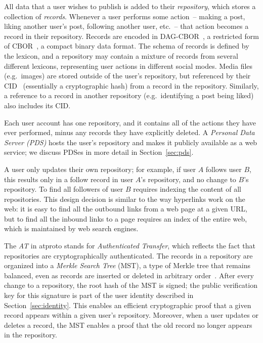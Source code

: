 \documentclass[sigconf,nonacm]{acmart}
\begin{document}
All data that a user wishes to publish is added to their \emph{repository}, which stores a collection of \emph{records}.
Whenever a user performs some action~-- making a post, liking another user's post, following another user, etc.~-- that action becomes a record in their repository.
Records are encoded in DAG-CBOR~\cite{DAG-CBOR}, a restricted form of CBOR~\cite{CBOR}, a compact binary data format.
The schema of records is defined by the lexicon, and a repository may contain a mixture of records from several different lexicons, representing user actions in different social modes.
Media files (e.g.\ images) are stored outside of the user's repository, but referenced by their CID~\cite{CID} (essentially a cryptographic hash) from a record in the repository.
Similarly, a reference to a record in another repository (e.g.\ identifying a post being liked) also includes its CID.

Each user account has one repository, and it contains all of the actions they have ever performed, minus any records they have explicitly deleted.
A \emph{Personal Data Server (PDS)} hosts the user's repository and makes it publicly available as a web service; we discuss PDSes in more detail in Section~\ref{sec:pds}.

A user only updates their own repository; for example, if user $A$ follows user $B$, this results only in a follow record in user $A$'s repository, and no change to $B$'s repository.
To find all followers of user $B$ requires indexing the content of all repositories.
This design decision is similar to the way hyperlinks work on the web: it is easy to find all the outbound links from a web page at a given URL, but to find all the inbound links to a page requires an index of the entire web, which is maintained by web search engines.

The \emph{AT} in atproto stands for \emph{Authenticated Transfer}, which reflects the fact that repositories are cryptographically authenticated.
The records in a repository are organized into a \emph{Merkle Search Tree} (MST), a type of Merkle tree that remains balanced, even as records are inserted or deleted in arbitrary order~\cite{Auvolat:2019}.
After every change to a repository, the root hash of the MST is signed; the public verification key for this signature is part of the user identity described in Section~\ref{sec:identity}.
This enables an efficient cryptographic proof that a given record appears within a given user's repository.
Moreover, when a user updates or deletes a record, the MST enables a proof that the old record no longer appears in the repository.
\end{document}
